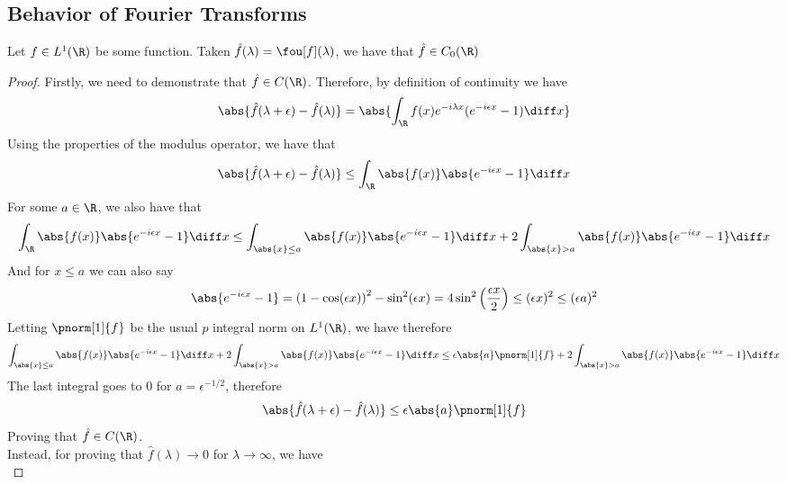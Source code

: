 \documentclass[../mmf.tex]{subfiles}
\begin{document}
\subsection{Behavior of Fourier Transforms}
\begin{thm}
	Let $f\in L^1(\R)$ be some function. Taken $\hat{f}(\lambda)=\fou[f](\lambda)$, we have that $\hat{f}\in C_0(\R)$
\end{thm}
\begin{proof}
	Firstly, we need to demonstrate that $\hat{f}\in C(\R)$. Therefore, by definition of continuity we have
	\begin{equation*}
		\abs{\hat{f}(\lambda+\epsilon)-\hat{f}(\lambda)}=\abs{\int_{\R}^{}f(x)e^{-i\lambda x}(e^{-i\epsilon x}-1)\diff x}
	\end{equation*}
	Using the properties of the modulus operator, we have that
	\begin{equation*}
		\abs{\hat{f}(\lambda+\epsilon)-\hat{f}(\lambda)}\le\int_{\R}^{}\abs{f(x)}\abs{e^{-i\epsilon x}-1}\diff x
	\end{equation*}
	For some $a\in\R$, we also have that
	\begin{equation*}
		\int_{\R}^{}\abs{f(x)}\abs{e^{-i\epsilon x}-1}\diff x\le\int_{\abs{x}\le a}^{}\abs{f(x)}\abs{e^{-i\epsilon x}-1}\diff x+2\int_{\abs{x}>a}^{}\abs{f(x)}\abs{e^{-i\epsilon x}-1}\diff x
	\end{equation*}
	And for $x\le a$ we can also say
	\begin{equation*}
		\abs{e^{-i\epsilon x}-1}=\left( 1-\cos(\epsilon x) \right)^2-\sin^2(\epsilon x)=4\sin^2\left( \frac{\epsilon x}{2} \right)\le(\epsilon x)^2\le(\epsilon a)^2
	\end{equation*}
	Letting $\pnorm[1]{f}$ be the usual $p$ integral norm on $L^1(\R)$, we have therefore
	\begin{equation*}
		\int_{\abs{x}\le a}^{}\abs{f(x)}\abs{e^{-i\epsilon x}-1}\diff x+2\int_{\abs{x}>a}^{}\abs{f(x)}\abs{e^{-i\epsilon x}-1}\diff x\le\epsilon\abs{a}\pnorm[1]{f}+2\int_{\abs{x}>a}^{}\abs{f(x)}\abs{e^{-i\epsilon x}-1}\diff x
	\end{equation*}
	The last integral goes to $0$ for $a=\epsilon^{-1/2}$, therefore
	\begin{equation*}
		\abs{\hat{f}(\lambda+\epsilon)-\hat{f}(\lambda)}\le\epsilon\abs{a}\pnorm[1]{f}
	\end{equation*}
	Proving that $\hat{f}\in C(\R)$.\\
	Instead, for proving that $\hat{f}(\lambda)\to0$ for $\lambda\to\infty$, we have
	\begin{equation*}

\end{equation*}
\end{proof}
\end{document}
